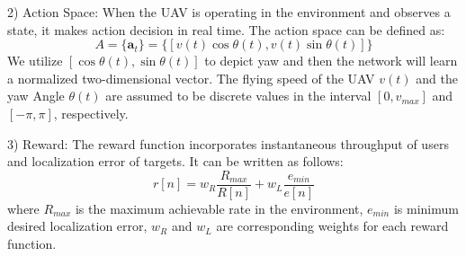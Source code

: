 \documentclass[journal,twocolumn]{IEEEtran}
\begin{document}
{%

2) Action Space: When the UAV is operating in the environment and observes a state, it makes action decision in real time. The action space can be defined as:
\begin{equation}
\textit{A} = \{\textbf{a}_{t}\} = \{ [v(t)\cos{\theta (t)}, v(t)\sin{\theta(t)}] \}
\end{equation}
We utilize $[\cos{\theta} (t), \sin{\theta(t)}]$ to depict yaw and then the network will learn a normalized two-dimensional vector. The flying speed of the UAV $v(t)$ and the yaw Angle $\theta(t)$ are assumed to be discrete values in the interval $[0, v_{max}]$ and $[{-}\pi, \pi]$, respectively.


3) Reward: The reward function incorporates instantaneous throughput of users and localization error of targets. It can be written as follows:
\begin{equation}\label{reward_fun}
r[n] = {w_{R}} \frac{R_{max}}{R[n]} + {w_{L}} \frac{e_{min}}{e[n]}
\end{equation}
where $R_{max}$ is the maximum achievable rate in the environment, $e_{min}$ is minimum desired localization error, $w_R$ and $w_L$ are corresponding weights for each reward function.












}
\end{document}
